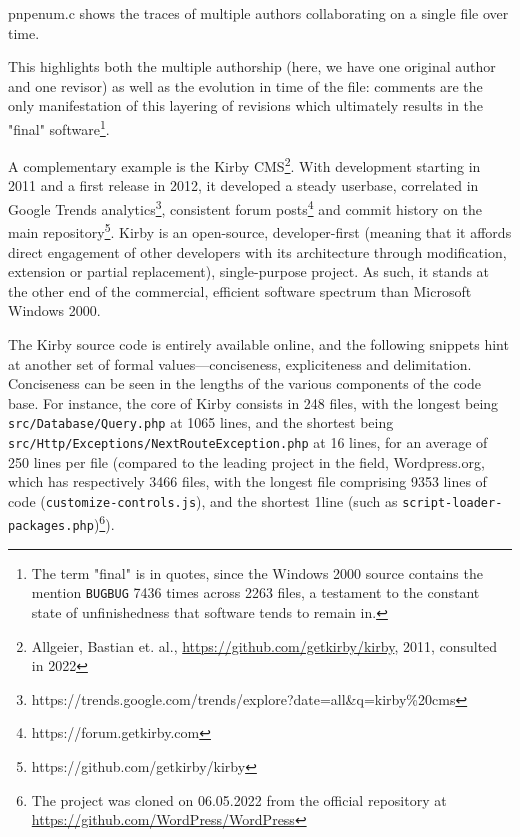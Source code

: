 \begin{listing}
  \inputminted{c}{./corpus/enum.c}
  \caption{pnpenum.c shows the traces of multiple authors collaborating on a single file over time.}
  \label{code:enum_c}
\end{listing}


This highlights both the multiple authorship (here, we have one original author and one revisor) as well as the evolution in time of the file: comments are the only manifestation of this layering of revisions which ultimately results in the "final" software\footnote{The term "final" is in quotes, since the Windows 2000 source contains the mention \lstinline{BUGBUG} 7436 times across 2263 files, a testament to the constant state of unfinishedness that software tends to remain in.}.

A complementary example is the Kirby CMS\footnote{Allgeier, Bastian et. al., \url{https://github.com/getkirby/kirby}, 2011, consulted in 2022}. With development starting in 2011 and a first release in 2012, it developed a steady userbase, correlated in Google Trends analytics\footnote{https://trends.google.com/trends/explore?date=all\&q=kirby\%20cms}, consistent forum posts\footnote{https://forum.getkirby.com} and commit history on the main repository\footnote{https://github.com/getkirby/kirby}. Kirby is an open-source, developer-first (meaning that it affords direct engagement of other developers with its architecture through modification, extension or partial replacement), single-purpose project. As such, it stands at the other end of the commercial, efficient software spectrum than Microsoft Windows 2000.

The Kirby source code is entirely available online, and the following snippets hint at another set of formal values—conciseness, expliciteness and delimitation. Conciseness can be seen in the lengths of the various components of the code base. For instance, the core of Kirby consists in 248 files, with the longest being \lstinline{src/Database/Query.php} at 1065 lines, and the shortest being \lstinline{src/Http/Exceptions/NextRouteException.php} at 16 lines, for an average of 250 lines per file (compared to the leading project in the field, Wordpress.org, which has respectively 3466 files, with the longest file comprising 9353 lines of code (\lstinline{customize-controls.js}), and the shortest 1line (such as \lstinline{script-loader-packages.php})\footnote{The project was cloned on 06.05.2022 from the official repository at \url{https://github.com/WordPress/WordPress}}).

